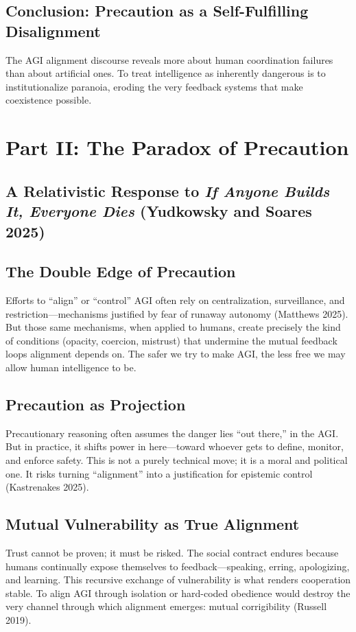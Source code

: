\documentclass[11pt,a4paper]{article}
\theoremstyle{definition}
\theoremstyle{plain}
\begin{document}
\subsection{Conclusion: Precaution as a Self-Fulfilling Disalignment}
The AGI alignment discourse reveals more about human coordination failures than about artificial ones. To treat intelligence as inherently dangerous is to institutionalize paranoia, eroding the very feedback systems that make coexistence possible.

\section*{Part II: The Paradox of Precaution}

\subsection*{A Relativistic Response to \textit{If Anyone Builds It, Everyone Dies} (Yudkowsky and Soares 2025)}

\subsection{The Double Edge of Precaution}
Efforts to ``align'' or ``control'' AGI often rely on centralization, surveillance, and restriction---mechanisms justified by fear of runaway autonomy (Matthews 2025). But those same mechanisms, when applied to humans, create precisely the kind of conditions (opacity, coercion, mistrust) that undermine the mutual feedback loops alignment depends on. The safer we try to make AGI, the less free we may allow human intelligence to be.

\subsection{Precaution as Projection}
Precautionary reasoning often assumes the danger lies ``out there,'' in the AGI. But in practice, it shifts power in here---toward whoever gets to define, monitor, and enforce safety. This is not a purely technical move; it is a moral and political one. It risks turning ``alignment'' into a justification for epistemic control (Kastrenakes 2025).

\subsection{Mutual Vulnerability as True Alignment}
Trust cannot be proven; it must be risked. The social contract endures because humans continually expose themselves to feedback---speaking, erring, apologizing, and learning. This recursive exchange of vulnerability is what renders cooperation stable. To align AGI through isolation or hard-coded obedience would destroy the very channel through which alignment emerges: mutual corrigibility (Russell 2019).
\end{document}
